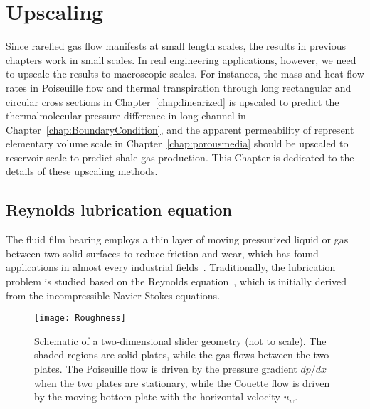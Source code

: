 \chapter{Upscaling}
\label{chap:upscaling}


Since rarefied gas flow manifests at small length scales, the results in previous chapters work in small scales. In real engineering applications, however, we need to upscale the results to macroscopic scales. For instances, the mass and heat flow rates in Poiseuille flow and thermal transpiration through long rectangular and circular cross sections in Chapter~\ref{chap:linearized} is upscaled to predict the thermalmolecular pressure difference in long channel in Chapter~\ref{chap:BoundaryCondition}, and the apparent permeability of represent elementary volume scale in Chapter~\ref{chap:porousmedia} should be upscaled to reservoir scale to predict shale gas production. This Chapter is dedicated to the details of these upscaling methods.   


\section{Reynolds lubrication equation}


The fluid film bearing employs a thin layer of moving pressurized liquid or gas between two solid surfaces to reduce friction and wear, which has found applications in almost every industrial fields~\cite{Szeri2011}. Traditionally, the lubrication problem is studied based on the Reynolds equation~\cite{Reynolds1886}, which is initially derived from the incompressible Navier-Stokes equations. 



\begin{figure}[t]
	\centering
	\texttt{[image: Roughness]}
	\caption{Schematic of a two-dimensional slider geometry (not to scale). The shaded regions are solid plates, while the gas flows between the two plates. The Poiseuille flow is driven by the pressure gradient $dp/dx$ when the two plates are stationary, while the Couette flow is driven by the moving bottom plate with the horizontal velocity $u_w$. }
	\label{Geom}
\end{figure}

